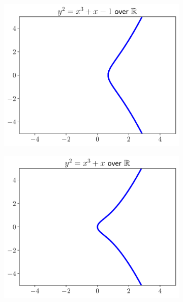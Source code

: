 \begin{figure}[p]
    \begin{subfigure}[t]{0.45\textwidth}
    \includegraphics[width=\textwidth]{plots/ec_reals/ec_reals_1_n1.pdf}
    \end{subfigure}
    \begin{subfigure}[t]{0.45\textwidth}
    \includegraphics[width=\textwidth]{plots/ec_reals/ec_reals_1_0.pdf}
    \end{subfigure}


\end{figure}
